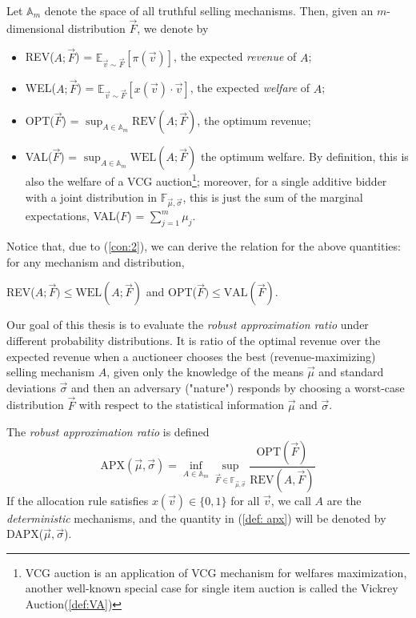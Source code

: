 Let $\mathbb{A}_m$ denote the space of all truthful selling mechanisms. Then, given an $m$-dimensional distribution $\vec{F}$, we denote by
\begin{itemize}
    \item REV($A;\vec{F}$) = $\mathbb{E}_{\vec{v} \sim \vec{F}}[\pi(\vec{v})]$, the expected \textit{revenue} of $A$;
    \item WEL($A;\vec{F}$) = $\mathbb{E}_{\vec{v} \sim \vec{F}}[x(\vec{v})\cdot\vec{v}]$, the expected \textit{welfare} of $A$;
    \item OPT($\vec{F}$) = $\sup_{A\in \mathbb{A}_m} \text{REV}(A;\vec{F})$, the optimum revenue;
    \item VAL($\vec{F}$) = $\sup_{A\in \mathbb{A}_m} \text{WEL}(A;\vec{F})$ the optimum welfare. By definition, this is also the welfare of a VCG auction\footnote{VCG auction is an application of VCG mechanism \cite[p.~216--222]{nisan_roughgarden_tardos_vazirani_2007} for welfares maximization, another well-known special case for single item auction is called the Vickrey Auction(\cref{def:VA})}; moreover, for a single additive bidder with a joint distribution in $\mathbb{F}_{\vec{\mu},\vec{\sigma}}$, this is just the sum of the marginal expectations, VAL($F$) = $\sum^m_{j=1} \mu_j$.
\end{itemize}
Notice that, due to (\ref{con:2}), we can derive the relation for the above quantities: for any mechanism and distribution, 
\begin{center}
    REV($A; \vec{F}) \leqslant \text{WEL}(A;\vec{F})$ \hspace{1cm} and \hspace{1cm} OPT($\vec{F}) \leqslant \text{VAL}(\vec{F})$.
\end{center}

Our goal of this thesis is to evaluate the \textit{robust approximation ratio} under different probability distributions. It is ratio of the optimal revenue over the expected revenue when a auctioneer chooses the best (revenue-maximizing) selling mechanism $A$, given only the knowledge of the means $\vec{\mu}$ and standard deviations $\vec{\sigma}$ and then an adversary ("nature") responds by choosing a worst-case distribution $\vec{F}$ with respect to the statistical information $\vec{\mu}$ and $\vec{\sigma}$.
\begin{definition}The \textit{robust approximation ratio} is defined
\begin{equation}
    \text{APX}(\vec{\mu}, \vec{\sigma}) = \inf_{ A\in \mathbb{A}_m}  \sup_{\vec{F}\in \mathbb{F}_{\vec{\mu}, \vec{\sigma}} } \frac{\text{OPT}(\vec{F})}{\text{REV}(A,\vec{F})}
\end{equation}
\label{def: apx}
If the allocation rule satisfies $x(\vec{v}) \in \{0,1\}$ for all $\vec{v}$, we call $A$ are the \textit{deterministic} mechanisms, and the quantity in (\ref{def: apx}) will be denoted by DAPX($\vec{\mu}, \vec{\sigma}$).
\end{definition}

